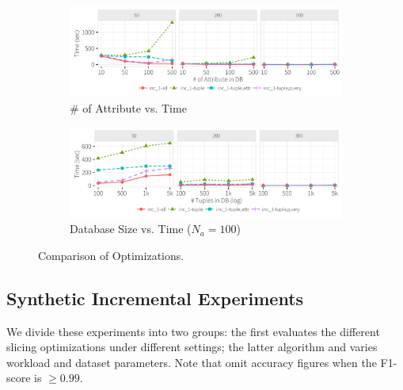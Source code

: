  \begin{figure}[h]
    \vspace*{-.1in}
    \centering
    \begin{subfigure}[t]{.45\textwidth}
    \includegraphics[width = .99\columnwidth]{figures/attr_time}
    \vspace*{-.1in}
    \caption{\# of Attribute vs. Time}
    \label{f:attr} 
    \end{subfigure}
    \begin{subfigure}[t]{.45\textwidth}
    \includegraphics[width = .99\columnwidth]{figures/attr100_time}
    \vspace*{-.1in}
    \caption{Database Size vs. Time ($N_a = 100$)}
    \label{f:attr100} 
    \end{subfigure}
    \vspace*{-.1in}
    \caption{Comparison of Optimizations.}
  \end{figure}
  

















\subsection{Synthetic Incremental Experiments}
\label{sec:experiments:synth}
We divide these experiments into two groups: the first evaluates the different slicing optimizations under different settings; 
the latter algorithm and varies workload and dataset parameters.
Note that omit accuracy figures when the F1-score is $\ge 0.99$.

